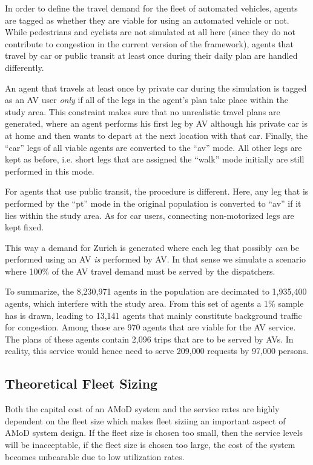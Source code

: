 In order to define the travel demand for the fleet of automated vehicles, agents
are tagged as whether they are viable for using an automated vehicle or not.
While pedestrians and cyclists are not simulated at all here (since they do not
contribute to congestion in the current version of the framework), agents that
travel by car or public transit at least once during their daily plan are
handled differently.

An agent that travels at least once by private car during the simulation is tagged
as an AV user \textit{only} if all of the legs in the agent's plan take place
within the study area. This constraint makes sure that no unrealistic travel
plans are generated, where an agent performs his first leg by AV although his
private car is at home and then wants to depart at the next location with that
car. Finally, the ``car'' legs of all viable agents are converted to the ``av'' mode.
All other legs are kept as before, i.e. short legs that are assigned the ``walk''
mode initially are still performed in this mode.

For agents that use public transit, the procedure is different. Here, any leg
that is performed by the ``pt'' mode in the original population is converted to ``av''
if it lies within the study area. As for car users, connecting non-motorized
legs are kept fixed.

This way a demand for Zurich is generated where each leg that possibly
\textit{can} be performed using an AV \textit{is} performed by AV. In that sense we
simulate a scenario where 100\% of the AV travel demand must be served by the
dispatchers.

To summarize, the 8,230,971 agents in the population are decimated to
1,935,400 agents, which interfere with the study area. From this set of agents
a 1\% sample has is drawn, leading to 13,141 agents that mainly constitute
background traffic for congestion. Among those are 970 agents that are viable for the AV
service. The plans of these agents contain 2,096 trips that are to be served by
AVs. In reality, this service would hence need to serve 209,000 requests by
97,000 persons.

\subsection{Theoretical Fleet Sizing}

Both the capital cost of an AMoD system and the service rates are highly dependent
on the fleet size which makes fleet siziing an important aspect of AMoD system design.
If the fleet size is chosen too small, then the service levels will be inacceptable, if the fleet size is chosen too large, the cost of the system becomes unbearable due to low utilization rates.

